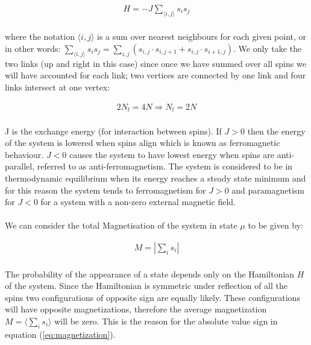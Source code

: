 \documentclass[12pt] {report} %
\begin{document}
			\begin{align}
				H = -J \sum_{\langle i,j \rangle}s_i s_j		\label{eq:hamiltonian}
			\end{align}
			
			\paragraph{}
				where the notation $\langle i,j \rangle$ is a sum over nearest neighbours for each given point, or in other words: $\sum_{\langle i,j \rangle}s_i s_j = \sum_{i, j}(s_{i,j} \cdot s_{i, j+1} + s_{i,j} \cdot s_{i+1, j})$. We only take the two links (up and right in this case) since once we have summed over all spins we will have accounted for each link; two vertices are connected by one link and four links intersect at one vertex:
				
			\begin{align}
				2N_l  = 4N \Rightarrow N_l = 2N 		\label{eq:number_of_links}
			\end{align}
				
			\paragraph{}
				J is the exchange energy (for interaction between spins). If $J > 0$ then the energy of the system is lowered when spins align which is known as ferromagnetic behaviour. $J < 0$ causes the system to have lowest energy when spins are anti-parallel, referred to as anti-ferromagnetism. The system is considered to be in thermodynamic equilibrium when its energy reaches a steady state minimum and for this reason the system tends to ferromagnetism for $J > 0$ and paramagnetism for $J < 0$ for a system with a non-zero external magnetic field.
				
				\paragraph{}
					We can consider the total Magnetisation of the system in state $\mu$ to be given by:
				
			\begin{align}
				M =	\left| \sum_{i}s_i \right|	\label{eq:magnetization}
			\end{align}
			
			\paragraph{}
				The probability of the appearance of a state depends only on the Hamiltonian $H$ of the system. Since the Hamiltonian is symmetric under reflection of all the spins two configurations of opposite sign are equally likely. These configurations will have opposite magnetizations, therefore the average magnetization $M =\langle\sum_{i}^{}s_i\rangle$ will be zero. This is the reason for the absolute value sign in equation (\ref{eq:magnetization}). 
				
\end{document}
